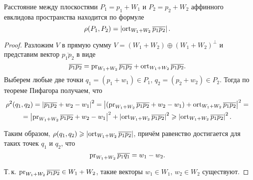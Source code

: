 \begin{theorem}
    Расстояние между плоскостями $P_1 = p_1 + W_1$ и $P_2 = p_2 + W_2$ аффинного евклидова пространства находится по формуле
    \[
        \rho(P_1, P_2) = \left\lvert\operatorname{ort}_{W_1 + W_2}\overline{p_1p_2}\right\rvert.
    \]
\end{theorem}

\begin{proof}
    Разложим $V$ в прямую сумму $V = (W_1 + W_2) \oplus (W_1 + W_2)^\perp$ и представим вектор $\overline{p_1p_2}$ в виде
    \[
        \overline{p_1p_2} = \operatorname{pr}_{W_1 + W_2}\overline{p_1p_2} + \operatorname{ort}_{W_1 + W_2}\overline{p_1p_2}.
    \]
    Выберем любые две точки $q_1 = (p_1 + w_1) \in P_1$, $q_2 = (p_2 + w_2) \in P_2$. Тогда по теореме Пифагора получаем, что
    \begin{multline*}
        \rho^2(q_1, q_2) = \left\lvert\overline{p_1p_2} + w_2 - w_1\right\rvert^2 = \left\lvert(\operatorname{pr}_{W_1 + W_2}\overline{p_1p_2} + w_2 - w_1) + \operatorname{ort}_{W_1 + W_2}\overline{p_1p_2}\right\rvert^2 =\\ = \left\lvert\operatorname{pr}_{W_1 + W_2}\overline{p_1p_2} + w_2 - w_1\right\rvert^2 + \left\lvert\operatorname{ort}_{W_1 + W_2}\overline{p_1p_2}\right\rvert^2 \geqslant \left\lvert\operatorname{ort}_{W_1 + W_2}\overline{p_1p_2}\right\rvert^2.
    \end{multline*}

    Таким образом, $\rho(q_1, q_2) \geqslant \left\lvert\operatorname{ort}_{W_1 + W_2}\overline{p_1p_2}\right\rvert$, причём равенство достигается для таких точек $q_1$ и $q_2$, что
    \[
        \operatorname{pr}_{W_1 + W_2}\overline{p_1q_1} = w_1 - w_2.
    \]

    Т.\,к. $\operatorname{pr}_{W_1 + W_2}\overline{p_1p_2} \in W_1 + W_2$, такие векторы $w_1 \in W_1$, $w_2 \in W_2$ существуют.
\end{proof}

